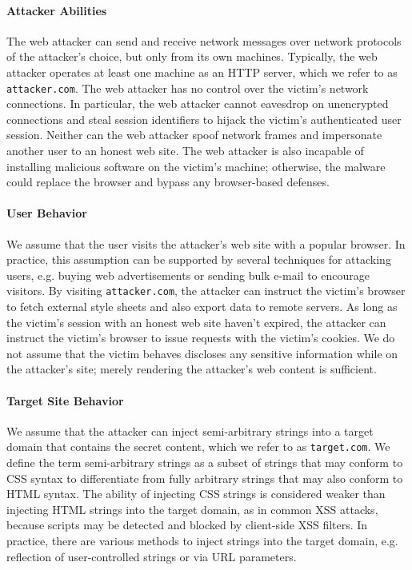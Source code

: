 \documentclass{acm_proc_article-sp}
\begin{document}
\paragraph{Attacker Abilities}
The web attacker can send and receive network messages over network protocols of the attacker's choice, but only from its own machines. Typically, the web attacker operates at least one machine as an HTTP server, which we refer to as \texttt{attacker.com}. The web attacker has no control over the victim's network connections. In particular, the web attacker cannot eavesdrop on unencrypted connections and steal session identifiers to hijack the victim's authenticated user session. Neither can the web attacker spoof network frames and impersonate another user to an honest web site.
The web attacker is also incapable of installing malicious software on the victim's machine; otherwise, the malware could replace the browser and bypass any browser-based defenses.

\paragraph{User Behavior}
We assume that the user visits the attacker's web site with a popular browser. In practice, this assumption can be supported by several techniques for attacking users, e.g. buying web advertisements or sending bulk e-mail to encourage visitors. By visiting \texttt{attacker.com}, the attacker can instruct the victim's browser to fetch external style sheets and also export data to remote servers. As long as the victim's session with an honest web site haven't expired, the attacker can instruct the victim's browser to issue requests with the victim's cookies.
We do not assume that the victim behaves discloses any sensitive information
while on the attacker's site; merely rendering the attacker's web content
is sufficient.

\paragraph{Target Site Behavior}
We assume that the attacker can inject semi-arbitrary strings into a target domain that contains the secret content, which we refer to as \texttt{target.com}. We define the term semi-arbitrary strings as a subset of strings that may conform to CSS syntax to differentiate from fully arbitrary strings that may also conform to HTML syntax. The ability of injecting CSS strings is considered weaker than injecting HTML strings into the target domain, as in common XSS attacks, because scripts may be detected and blocked by client-side XSS filters. In practice, there are various methods to inject strings into the target domain, e.g. reflection of user-controlled strings or via URL parameters.
\end{document}
